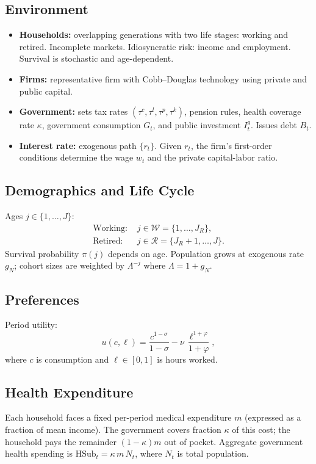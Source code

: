 \subsection{Environment}
\begin{itemize}[leftmargin=*]
    \item \textbf{Households:} overlapping generations with two life stages: working and retired. Incomplete markets. Idiosyncratic risk: income and employment. Survival is stochastic and age-dependent.
    \item \textbf{Firms:} representative firm with Cobb--Douglas technology using private and public capital.
    \item \textbf{Government:} sets tax rates $(\tau^c,\tau^l,\tau^p,\tau^k)$, pension rules, health coverage rate $\kappa$, government consumption $G_t$, and public investment $I_t^g$. Issues debt $B_t$.
    \item \textbf{Interest rate:} exogenous path $\{r_t\}$. Given $r_t$, the firm's first-order conditions determine the wage $w_t$ and the private capital-labor ratio.
\end{itemize}

\subsection{Demographics and Life Cycle}
Ages $j \in \{1,\dots,J\}$:
\begin{align*}
\text{Working: } & j \in \mathcal{W}=\{1,\dots,J_R\}, \\
\text{Retired: } & j \in \mathcal{R}=\{J_R+1,\dots,J\}.
\end{align*}
Survival probability $\pi(j)$ depends on age. Population grows at exogenous rate $g_N$; cohort sizes are weighted by $\Lambda^{-j}$ where $\Lambda = 1+g_N$.

\subsection{Preferences}
Period utility:
\begin{equation}
u(c,\ell) = \frac{c^{1-\sigma}}{1-\sigma} - \nu\,\frac{\ell^{1+\varphi}}{1+\varphi},
\end{equation}
where $c$ is consumption and $\ell \in [0,1]$ is hours worked.

\subsection{Health Expenditure}
Each household faces a fixed per-period medical expenditure $m$ (expressed as a fraction of mean income). The government covers fraction $\kappa$ of this cost; the household pays the remainder $(1-\kappa)m$ out of pocket. Aggregate government health spending is $\text{HSub}_t = \kappa\,m\,N_t$, where $N_t$ is total population.

